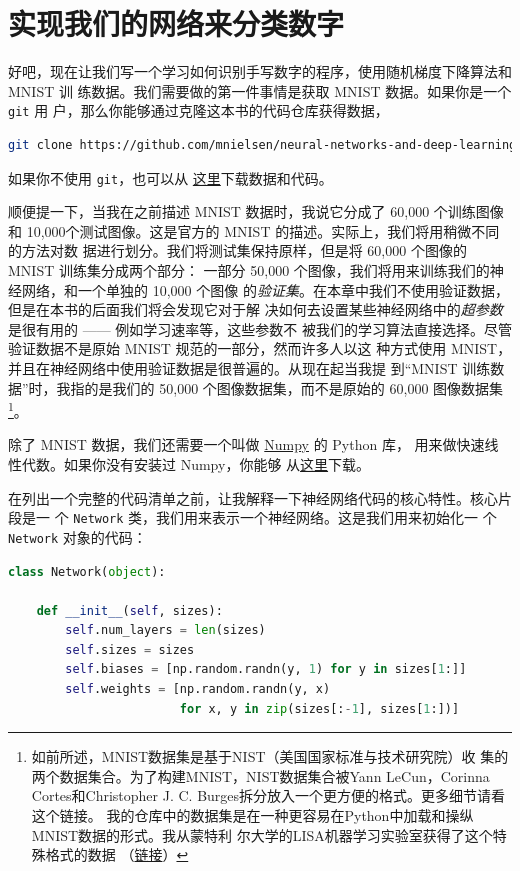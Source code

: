 \section{实现我们的网络来分类数字}
\label{sec:implementing_our_network_to_classify_digits}

好吧，现在让我们写一个学习如何识别手写数字的程序，使用随机梯度下降算法和 MNIST 训
练数据。我们需要做的第一件事情是获取 MNIST 数据。如果你是一个 \lstinline!git! 用
户，那么你能够通过克隆这本书的代码仓库获得数据，

\begin{lstlisting}[language=sh]
git clone https://github.com/mnielsen/neural-networks-and-deep-learning.git
\end{lstlisting}

如果你不使用 \lstinline!git!，也可以从%
\href{https://github.com/mnielsen/neural-networks-and-deep-learning/archive/master.zip}{
  这里}下载数据和代码。

顺便提一下，当我在之前描述 MNIST 数据时，我说它分成了 60,000 个训练图像
和 10,000个测试图像。这是官方的 MNIST 的描述。实际上，我们将用稍微不同的方法对数
据进行划分。我们将测试集保持原样，但是将 60,000 个图像的 MNIST 训练集分成两个部分：
一部分 50,000 个图像，我们将用来训练我们的神经网络，和一个单独的 10,000 个图像
的\emph{验证集}。在本章中我们不使用验证数据，但是在本书的后面我们将会发现它对于解
决如何去设置某些神经网络中的\emph{超参数}是很有用的 —— 例如学习速率等，这些参数不
被我们的学习算法直接选择。尽管验证数据不是原始 MNIST 规范的一部分，然而许多人以这
种方式使用 MNIST，并且在神经网络中使用验证数据是很普遍的。从现在起当我提
到``MNIST 训练数据''时，我指的是我们的 50,000 个图像数据集，而不是原始的 60,000
图像数据集\footnote{如前所述，MNIST数据集是基于NIST（美国国家标准与技术研究院）收
  集的两个数据集合。为了构建MNIST，NIST数据集合被Yann LeCun，Corinna
  Cortes和Christopher J. C. Burges拆分放入一个更方便的格式。更多细节请看这个链接。
  我的仓库中的数据集是在一种更容易在Python中加载和操纵MNIST数据的形式。我从蒙特利
  尔大学的LISA机器学习实验室获得了这个特殊格式的数据
  （\href{http://www.deeplearning.net/tutorial/gettingstarted.html}{链接}）}。

除了 MNIST 数据，我们还需要一个叫做 \href{http://numpy.org/}{Numpy} 的 Python 库，
用来做快速线性代数。如果你没有安装过 Numpy，你能够
从\href{http://www.scipy.org/install.html}{这里}下载。

在列出一个完整的代码清单之前，让我解释一下神经网络代码的核心特性。核心片段是一
个 \lstinline!Network! 类，我们用来表示一个神经网络。这是我们用来初始化一
个 \lstinline!Network! 对象的代码：
\begin{lstlisting}[language=Python]
class Network(object):

	def __init__(self, sizes):
		self.num_layers = len(sizes)
		self.sizes = sizes
		self.biases = [np.random.randn(y, 1) for y in sizes[1:]]
		self.weights = [np.random.randn(y, x)
						for x, y in zip(sizes[:-1], sizes[1:])]
\end{lstlisting}

